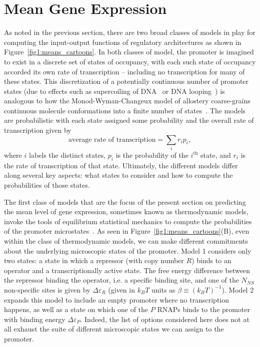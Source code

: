 \section{Mean Gene Expression}\label{section_02_means}

As noted in the previous section, there are two broad classes of models in play
for computing the input-output functions of regulatory architectures as shown in
Figure~\ref{fig1:means_cartoons}. In both classes of model, the promoter is
imagined to exist in a discrete set of states of occupancy, with each such state
of occupancy accorded its own rate of transcription -- including no
transcription for many of these states. This discretization of a potentially
continuous number of promoter states (due to effects such as supercoiling of
DNA~\cite{Chong2014, Sevier2016}  or DNA looping~\cite{Boedicker2013a}) is
analogous to how the Monod-Wyman-Changeux model of allostery coarse-grains
continuous molecule conformations into a finite number of
states~\cite{Martins2011}. The models are probabilistic with each state assigned
some probability and the overall rate of transcription given by 
\begin{equation}
\mbox{average rate of transcription} = \sum_i r_i p_i,
\label{eq:transcrip_prop_pbound}
\end{equation}
where $i$ labels the distinct states, $p_i$ is the probability of the
$i^{\text{th}}$ state, and $r_i$ is the rate of transcription of that state.
Ultimately, the different models differ along several key aspects: what states
to consider and how to compute the probabilities of those states.

The first class of models that are the focus of the present section on
predicting the mean level of gene expression, sometimes known as thermodynamic
models, invoke the tools of equilibrium statistical mechanics to compute the
probabilities of the promoter microstates~\cite{Ackers1982, Shea1985,
Buchler2003, Vilar2003a, Vilar2003b, Bintu2005a, Bintu2005c, Gertz2009,
Sherman2012, Saiz2013}. As seen in Figure~\ref{fig1:means_cartoons}(B), even
within the class of thermodynamic models, we can make different commitments
about the underlying microscopic states of the promoter. Model 1 considers only
two states: a state in which a repressor (with copy number $R$) binds to an
operator and a transcriptionally active state. The free energy difference
between the repressor binding the operator, i.e. a specific binding site, and
one of the $N_{NS}$ non-specific sites is given by $\Delta\varepsilon_R$ (given
in $k_BT$ units as $\beta\equiv (k_BT)^{-1}$). Model 2 expands this model to
include an empty promoter where no transcription happens, as well as a state on
which one of the $P$ RNAPs binds to the promoter with binding energy
$\Delta\varepsilon_P$. Indeed, the list of options considered here does not at
all exhaust the suite of different microscopic states we can assign to the
promoter.

